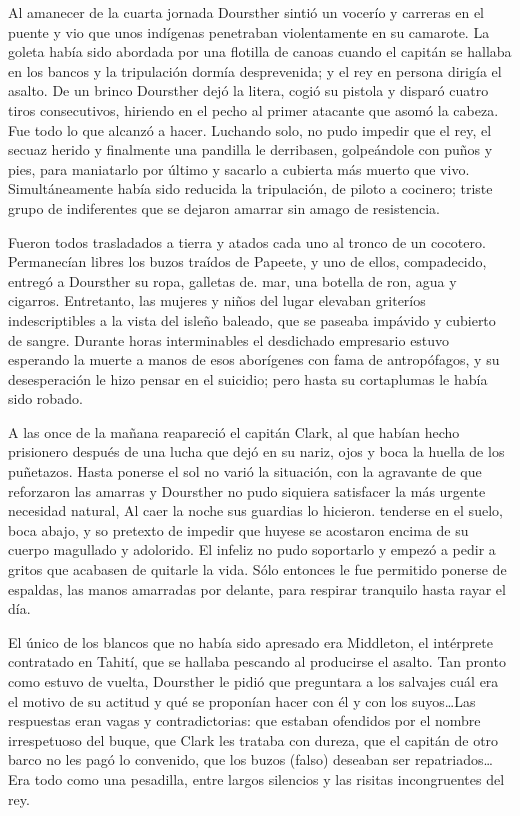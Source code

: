 \documentclass[10pt,twoside,openright]{memoir}
\begin{document}
Al amanecer de la cuarta jornada Doursther sintió un vocerío y carreras
en el puente y vio que unos indígenas
penetraban violentamente en su camarote. La goleta había sido abordada
por una flotilla de canoas cuando el
capitán se hallaba en los bancos y la tripulación dormía desprevenida; y
el rey en persona dirigía el asalto. De un brinco Doursther dejó la
litera, cogió su pistola y disparó cuatro tiros consecutivos, hiriendo
en el pecho al primer atacante que asomó la cabeza. Fue todo lo que
alcanzó a hacer. Luchando solo, no pudo impedir que el rey, el secuaz
herido y finalmente una pandilla le derribasen, golpeándole con puños y
pies, para maniatarlo por último y sacarlo a cubierta más muerto que
vivo. Simultáneamente había sido reducida la tripulación,
de piloto a cocinero; triste grupo de
indiferentes que se dejaron amarrar sin amago de resistencia.

Fueron todos trasladados a tierra y atados cada uno al tronco de un
cocotero. Permanecían libres los buzos traídos de Papeete, y uno de
ellos, compadecido, entregó a Doursther su ropa, galletas de. mar, una
botella de ron, agua y cigarros. Entretanto, las mujeres y niños del
lugar elevaban griteríos indescriptibles a la vista del isleño baleado,
que se paseaba impávido y cubierto de sangre. Durante horas
interminables el desdichado empresario estuvo esperando la muerte a
manos de esos aborígenes con fama de antropófagos, y su desesperación le
hizo pensar en el suicidio; pero hasta su cortaplumas le había sido
robado.

A las once de la mañana reapareció el capitán Clark, al que habían hecho
prisionero después de una lucha que dejó en su nariz, ojos y boca la
huella de los puñetazos. Hasta ponerse el sol no varió la situación, con
la agravante de que reforzaron las amarras y Doursther no pudo siquiera
satisfacer la más urgente necesidad
natural, Al caer la noche sus guardias lo hicieron. tenderse en el
suelo, boca abajo, y so pretexto de impedir que huyese se acostaron
encima de su cuerpo magullado y adolorido. El infeliz no pudo soportarlo
y empezó a pedir a gritos que acabasen de quitarle la vida. Sólo
entonces le fue permitido ponerse de espaldas, las manos amarradas por
delante, para respirar tranquilo hasta rayar el
día.

El único de los blancos que no había sido apresado era Middleton, el
intérprete contratado en Tahití, que se hallaba pescando al producirse
el asalto. Tan pronto como estuvo de vuelta, Doursther le pidió que
preguntara a los salvajes cuál era el motivo de su actitud y qué se
proponían hacer con él y con los suyos\ldots Las respuestas eran vagas y
contradictorias: que estaban ofendidos por el nombre irrespetuoso del
buque, que Clark les trataba con dureza, que el capitán de otro barco no
les pagó lo convenido, que los buzos (falso) deseaban ser repatriados\ldots
Era todo como una pesadilla, entre largos silencios y las risitas
incongruentes del rey.
\end{document}
